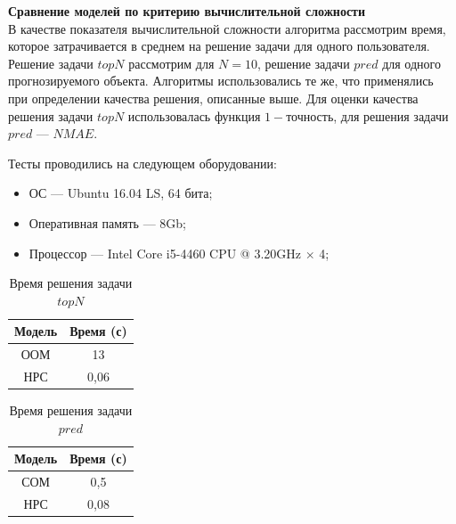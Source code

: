 {\bf Сравнение моделей по критерию вычислительной сложности} \\
В качестве показателя вычислительной сложности алгоритма рассмотрим время,
которое затрачивается в среднем на решение задачи для одного пользователя.
Решение задачи $topN$ рассмотрим для $N = 10$, решение задачи $pred$
для одного прогнозируемого объекта. Алгоритмы использовались те же, что
применялись при определении качества решения, описанные выше.
Для оценки качества решения задачи $topN$ использовалась функция $1 -
\text{точность}$, для решения задачи $pred$ --- $NMAE$.

Тесты проводились на следующем оборудовании:
\begin{itemize}
	\item ОС --- Ubuntu 16.04 LS, 64 бита;
	\item Оперативная память --- 8Gb;
	\item Процессор --- Intel Core i5-4460 CPU @ 3.20GHz $\times$ 4;
\end{itemize}

\begin{table}[htb]
	\caption{Время решения задачи $topN$}
  \begin{center}
	\label{table:time-topn}
	\begin{tabular}{|c|c|}
	  \hline
		Модель & Время (с)\\ \hline
		ООМ& 13\\ \hline
		НРС&0,06 \\ \hline
	\end{tabular}
  \end{center}
\end{table}

\begin{table}[htb]
\caption{Время решения задачи $pred$}
  \begin{center}
	\label{table:time-p}
	\begin{tabular}{|c|c|}
	  \hline
		Модель & Время (с)\\ \hline
		СОМ& 0,5\\ \hline
		НРС&0,08 \\ \hline
	\end{tabular}
  \end{center}
\end{table}

